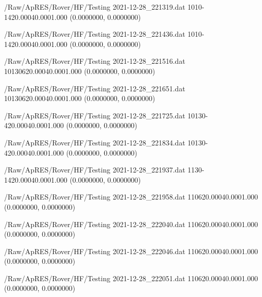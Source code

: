 \hfaprestable
{/Raw/ApRES/Rover/HF/Testing}%
{2021-12-28\_221319.dat}%
{10}{1}{0}{-14}{20.000}{40.000}{1.000}%
{ (0.0000000, 0.0000000)}%
{}%
{}%

\hfaprestable
{/Raw/ApRES/Rover/HF/Testing}%
{2021-12-28\_221436.dat}%
{10}{1}{0}{-14}{20.000}{40.000}{1.000}%
{ (0.0000000, 0.0000000)}%
{}%
{}%

\hfaprestable
{/Raw/ApRES/Rover/HF/Testing}%
{2021-12-28\_221516.dat}%
{10}{1}{30}{6}{20.000}{40.000}{1.000}%
{ (0.0000000, 0.0000000)}%
{}%
{}%

\hfaprestable
{/Raw/ApRES/Rover/HF/Testing}%
{2021-12-28\_221651.dat}%
{10}{1}{30}{6}{20.000}{40.000}{1.000}%
{ (0.0000000, 0.0000000)}%
{}%
{}%

\hfaprestable
{/Raw/ApRES/Rover/HF/Testing}%
{2021-12-28\_221725.dat}%
{10}{1}{30}{-4}{20.000}{40.000}{1.000}%
{ (0.0000000, 0.0000000)}%
{}%
{}%

\hfaprestable
{/Raw/ApRES/Rover/HF/Testing}%
{2021-12-28\_221834.dat}%
{10}{1}{30}{-4}{20.000}{40.000}{1.000}%
{ (0.0000000, 0.0000000)}%
{}%
{}%

\hfaprestable
{/Raw/ApRES/Rover/HF/Testing}%
{2021-12-28\_221937.dat}%
{1}{1}{30}{-14}{20.000}{40.000}{1.000}%
{ (0.0000000, 0.0000000)}%
{}%
{}%

\hfaprestable
{/Raw/ApRES/Rover/HF/Testing}%
{2021-12-28\_221958.dat}%
{1}{1}{0}{6}{20.000}{40.000}{1.000}%
{ (0.0000000, 0.0000000)}%
{}%
{}%

\hfaprestable
{/Raw/ApRES/Rover/HF/Testing}%
{2021-12-28\_222040.dat}%
{1}{1}{0}{6}{20.000}{40.000}{1.000}%
{ (0.0000000, 0.0000000)}%
{}%
{}%

\hfaprestable
{/Raw/ApRES/Rover/HF/Testing}%
{2021-12-28\_222046.dat}%
{1}{1}{0}{6}{20.000}{40.000}{1.000}%
{ (0.0000000, 0.0000000)}%
{}%
{}%

\hfaprestable
{/Raw/ApRES/Rover/HF/Testing}%
{2021-12-28\_222051.dat}%
{1}{1}{0}{6}{20.000}{40.000}{1.000}%
{ (0.0000000, 0.0000000)}%
{}%
{}%

